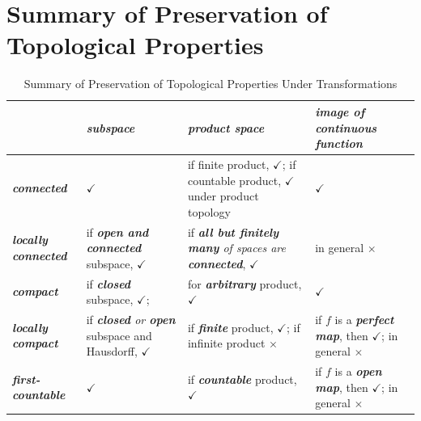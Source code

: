 \documentclass[11pt]{article}
\begin{document}
\section{Summary of Preservation of Topological Properties}
\begin{table}[h!]
\setlength{\abovedisplayskip}{0pt}
\setlength{\belowdisplayskip}{-10pt}
\setlength{\abovedisplayshortskip}{0pt}
\setlength{\belowdisplayshortskip}{0pt}
\footnotesize
\centering
\caption{Summary of Preservation of Topological Properties Under Transformations}
\label{tab: preservation}
\renewcommand\tabularxcolumn[1]{m{#1}}
\small
\begin{tabularx}{1\textwidth} { 
  | >{\raggedright\arraybackslash} m{3cm}
  | >{\centering\arraybackslash}X
  | >{\centering\arraybackslash}X
  | >{\centering\arraybackslash}X  | }
 \hline
  &  \emph{\textbf{subspace}} &  \emph{\textbf{product space}} &  \emph{\textbf{image of continuous function}}   \\
  \hline \vspace{5pt}
\emph{\textbf{connected}}  \vspace{2pt} & $\checkmark$  &  if finite product, $\checkmark$; if countable product, $\checkmark$ under product topology  &   $\checkmark$  \\
\hline \vspace{5pt}
\emph{\textbf{locally connected}}  \vspace{2pt} & if \emph{\textbf{open and connected}} subspace, $\checkmark$  & if \emph{\textbf{all but finitely many} of spaces are \textbf{connected}},  $\checkmark$  & in general  $\times$  \\
 \hline \vspace{5pt}
\emph{\textbf{compact}}  \vspace{2pt} & if \emph{\textbf{closed}} subspace, $\checkmark$;  & for \emph{\textbf{arbitrary}} product, $\checkmark$ & $\checkmark$ \\
 \hline \vspace{5pt}
\emph{\textbf{locally compact}}  \vspace{2pt} & if \emph{\textbf{closed} or \textbf{open}} subspace and Hausdorff, $\checkmark$  & if \emph{\textbf{finite}} product, $\checkmark$; if infinite product $\times$ & if $f$ is a \emph{\textbf{perfect map}}, then $\checkmark$; in general $\times$ \\
 \hline \vspace{5pt}
\emph{\textbf{first-countable}} \vspace{2pt}  &  $\checkmark$ & if \emph{\textbf{countable}} product, $\checkmark$ &  if $f$ is a \emph{\textbf{open map}}, then $\checkmark$; in general $\times$ \\

\end{tabularx}
\end{table}
\end{document}
